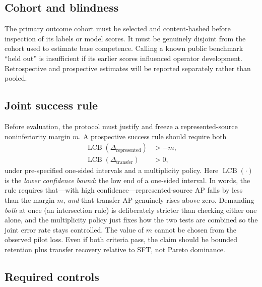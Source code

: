 \documentclass[11pt]{article}
\begin{document}
\subsection{Cohort and blindness}

The primary outcome cohort must be selected and content-hashed before inspection of its labels or
model scores.  It must be genuinely disjoint from the cohort used to estimate base competence.
Calling a known public benchmark ``held out'' is insufficient if its earlier scores influenced
operator development.  Retrospective and prospective estimates will be reported separately rather
than pooled.

\subsection{Joint success rule}

Before evaluation, the protocol must justify and freeze a represented-source noninferiority
margin $m$.  A prospective success rule should require both
\begin{align}
  \operatorname{LCB}(\Delta_{\mathrm{represented}}) &> -m, \\
  \operatorname{LCB}(\Delta_{\mathrm{transfer}}) &> 0,
\end{align}
under pre-specified one-sided intervals and a multiplicity policy. Here $\operatorname{LCB}(\cdot)$ is the \emph{lower confidence bound}: the low end of a one-sided interval. In words, the rule requires that---with high confidence---represented-source AP falls by less than the margin $m$, \emph{and} that transfer AP genuinely rises above zero. Demanding \emph{both} at once (an intersection rule) is deliberately stricter than checking either one alone, and the multiplicity policy just fixes how the two tests are combined so the joint error rate stays controlled.  The value of $m$ cannot be
chosen from the observed pilot loss.  Even if both criteria pass, the claim should be bounded
retention plus transfer recovery relative to SFT, not Pareto dominance.

\subsection{Required controls}
\end{document}
